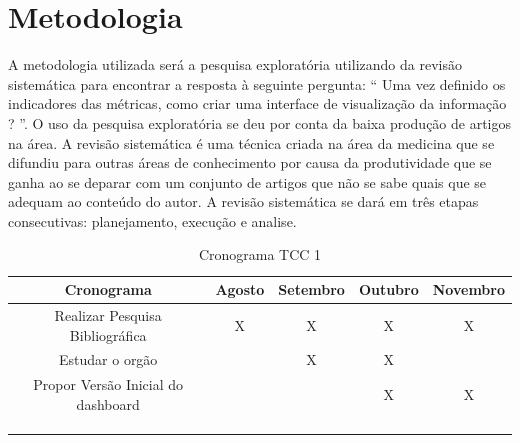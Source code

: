 \chapter[Metodologia]{Metodologia}

A metodologia utilizada será a pesquisa exploratória utilizando da revisão sistemática para encontrar a resposta à seguinte pergunta: “ Uma vez definido os indicadores das métricas, como criar uma interface de visualização da informação ? ”. O uso da pesquisa exploratória se deu por conta da baixa produção de artigos na área. A revisão sistemática é uma técnica criada na área da medicina que se difundiu para outras áreas de conhecimento por causa da produtividade que se ganha ao se deparar com um conjunto de artigos que não se sabe quais que se adequam ao conteúdo do autor. A revisão sistemática se dará em três etapas consecutivas: planejamento, execução e analise.


\begin{table}[http]
	\centering
	\caption{Cronograma TCC 1}
	\label{tab:cronograma}
	\begin{tabular}{ccccc}
		\hline
		\multicolumn{1}{|c|}{\textbf{Cronograma}}             & \multicolumn{1}{c|}{\textbf{Agosto}} & \multicolumn{1}{c|}{\textbf{Setembro}} & \multicolumn{1}{c|}{\textbf{Outubro}} & \multicolumn{1}{c|}{\textbf{Novembro}} \\ \hline
		\multicolumn{1}{|c|}{Realizar Pesquisa Bibliográfica} & \multicolumn{1}{c|}{X}              & \multicolumn{1}{c|}{X}              & \multicolumn{1}{c|}{X}             & \multicolumn{1}{c|}{X}              \\ \hline
		\multicolumn{1}{|c|}{Estudar o orgão}             & \multicolumn{1}{c|}{}               & \multicolumn{1}{c|}{X}              & \multicolumn{1}{c|}{X}             & \multicolumn{1}{c|}{}               \\ \hline
		\multicolumn{1}{|c|}{Propor Versão Inicial do dashboard}                & \multicolumn{1}{c|}{}               & \multicolumn{1}{c|}{}               & \multicolumn{1}{c|}{X}             & \multicolumn{1}{c|}{X}              \\ \hline
		\multicolumn{1}{l}{}                                  & \multicolumn{1}{l}{}                & \multicolumn{1}{l}{}                & \multicolumn{1}{l}{}               & \multicolumn{1}{l}{}                \\
		\multicolumn{1}{l}{}                                  & \multicolumn{1}{l}{}                & \multicolumn{1}{l}{}                & \multicolumn{1}{l}{}               & \multicolumn{1}{l}{}                \\
		\multicolumn{1}{l}{}                                  & \multicolumn{1}{l}{}                & \multicolumn{1}{l}{}                & \multicolumn{1}{l}{}               & \multicolumn{1}{l}{}               
	\end{tabular}
\end{table}


